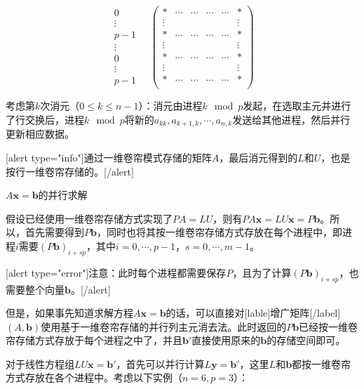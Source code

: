 \documentclass[UTF8,nofonts]{ctexart}
\begin{document}
\[
\begin{matrix}0\\\vdots\\p-1\\\vdots\\0\\\vdots\\p-1\end{matrix}\quad
\begin{pmatrix}
	\ast&\cdots&\cdots&\cdots&\cdots&\ast \\
	\vdots&&&&&\vdots \\
	\ast&\cdots&\cdots&\cdots&\cdots&\ast \\
	\vdots&&&&&\vdots \\
	\ast&\cdots&\cdots&\cdots&\cdots&\ast \\
	\vdots&&&&&\vdots \\
	\ast&\cdots&\cdots&\cdots&\cdots&\ast \\
\end{pmatrix}
\]

考虑第$k$次消元（$0 \leq k \leq n-1$）：消元由进程$k \mod p$发起，在选取主元并进行了行交换后，进程$k \mod p$将新的$a_{kk},a_{k+1,k},\cdots,a_{n,k}$发送给其他进程，然后并行更新相应数据。

[alert type="info"]通过一维卷帘模式存储的矩阵$A$，最后消元得到的$L$和$U$，也是按行一维卷帘存储的。[/alert]

$A\boldsymbol{x}=\boldsymbol{b}$的并行求解

假设已经使用一维卷帘存储方式实现了$PA=LU$，则有$PA\boldsymbol{x}=LU\boldsymbol{x}=P\boldsymbol{b}$。所以，首先需要得到$P\boldsymbol{b}$，同时也将其按一维卷帘存储方式存放在每个进程中，即进程$i$需要$(P\boldsymbol{b})_{i+sp}$，其中$i=0,\cdots,p-1$，$s=0,\cdots,m-1$。

[alert type="error"]注意：此时每个进程都需要保存$P$，且为了计算$(P\boldsymbol{b})_{i+sp}$，也需要整个向量$\boldsymbol{b}$。[/alert]

但是，如果事先知道求解方程$A\boldsymbol{x}=\boldsymbol{b}$的话，可以直接对[lable]增广矩阵[/label]$(A,\boldsymbol{b})$使用基于一维卷帘存储的并行列主元消去法。此时返回的$P\boldsymbol{b}$已经按一维卷帘存储方式存放于每个进程之中了，并且$\boldsymbol{b}'$直接使用原来的$\boldsymbol{b}$的存储空间即可。

对于线性方程组$LU\boldsymbol{x}=\boldsymbol{b}'$，首先可以并行计算$L\boldsymbol{y}=\boldsymbol{b}'$，这里$L$和$\boldsymbol{b}$都按一维卷帘方式存放在各个进程中。考虑以下实例（$n=6,p=3$）：
\end{document}
